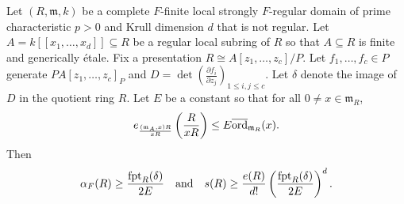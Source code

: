 \documentclass[12pt]{amsart}
\numberwithin{equation}{theorem}
\theoremstyle{plain}
\newcommand{\fm}{\mathfrak{m}}
\begin{document}
\begin{theorem}
    \label{thm: alpha F-invariant lower bound by fpt of Jacobian element}
    Let $(R,\fm,k)$ be a complete $F$-finite local strongly $F$-regular domain of prime characteristic $p>0$ and Krull dimension $d$ that is not regular. Let $A = k[[x_1,\ldots,x_d]]\subseteq R$ be a regular local subring of $R$ so that $A\subseteq R$ is finite and generically \'etale. Fix a presentation $R\cong A[z_1,\ldots,z_c]/P$. Let $f_1,\ldots,f_c\in P$ generate $PA[z_1,\ldots,z_c]_P$ and $D=\det(\frac{\partial f_i}{\partial z_j})_{1\leq i,j\leq c}$. Let $\delta$ denote the image of $D$ in the quotient ring $R$. Let $E$ be a constant so that for all $0\not=x\in \fm_R$, 
        \[
        e_{\frac{(\fm_A,x)R}{xR}}\left(\frac{R}{xR}\right)\leq E\overline{\ord}_{\fm_R}(x).
        \]
        Then
        \[
        \alpha_F(R)\geq \frac{\operatorname{{fpt}}_R(\delta)}{2E}\quad \mbox{and}\quad s(R) \geq \frac{e(R)}{d!}\left(\frac{\operatorname{{fpt}}_R(\delta)}{2E}\right)^d.
        \]
\end{theorem}
\end{document}
